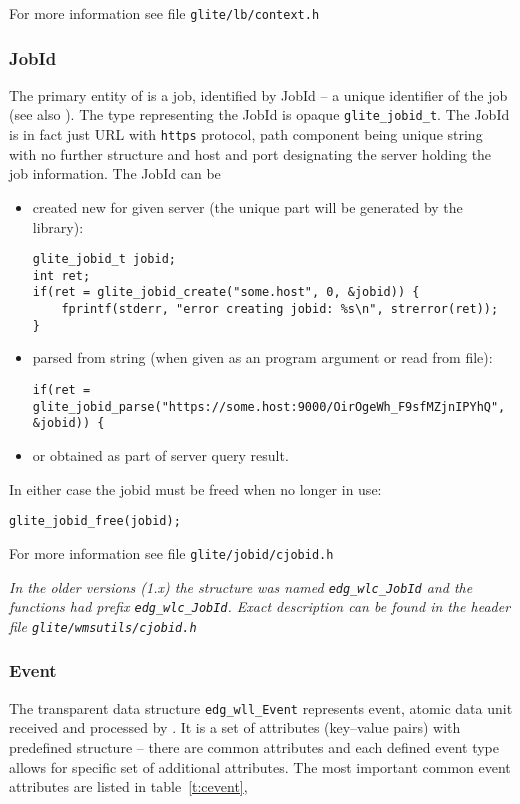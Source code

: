 For more information see file \verb'glite/lb/context.h'

\subsubsection{JobId} 
The primary entity of \LB is a job, identified by JobId -- a unique
identifier of the job (see also \cite{lbug}). The type representing
the JobId is opaque \verb'glite_jobid_t'. The JobId is in fact
just URL with \verb'https' protocol, path component being unique string
with no further structure and host and port designating the \LB server
holding the job information. The JobId can be
\begin{itemize}
\item created new for given \LB server (the unique part will be
generated by the \LB library):
\begin{lstlisting}
glite_jobid_t jobid;
int ret; 
if(ret = glite_jobid_create("some.host", 0, &jobid)) {
	fprintf(stderr, "error creating jobid: %s\n", strerror(ret));
}
\end{lstlisting}
\item parsed from string (\eg when given as an program argument or
read from file):
\begin{lstlisting}[firstnumber=3]
if(ret = glite_jobid_parse("https://some.host:9000/OirOgeWh_F9sfMZjnIPYhQ", &jobid)) {
\end{lstlisting}
\item or obtained as part of \LB server query result.
\end{itemize}
In either case the jobid must be freed when no longer in use:
\begin{lstlisting}
glite_jobid_free(jobid);
\end{lstlisting}

For more information see file \verb'glite/jobid/cjobid.h'

%
{\it In the older \LB versions (1.x) the
structure was named \verb'edg_wlc_JobId' and the functions had prefix
\verb'edg_wlc_JobId'. Exact description can be found in the
header file \verb'glite/wmsutils/cjobid.h'}


\subsubsection{Event}
\label{s:edg_wll_Event}
The transparent data structure \verb'edg_wll_Event' represents \LB
event, atomic data unit received and processed by \LB. It is a set of
attributes (\ie key--value pairs) with predefined structure -- there
are common attributes and each defined event type allows for specific
set of additional attributes.  The most important common event
attributes are listed in table~\ref{t:cevent}, 

